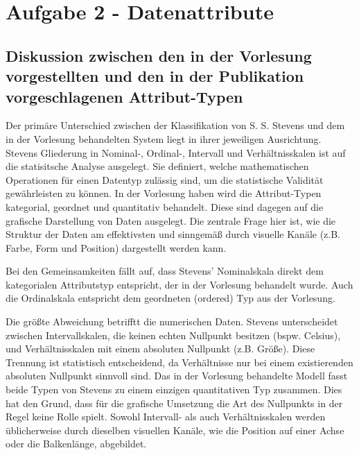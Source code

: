 \documentclass[10pt, a4paper]{article}
\begin{document}
% 


\section*{Aufgabe 2 - Datenattribute}
\subsection*{Diskussion zwischen den in der Vorlesung vorgestellten und den in der Publikation vorgeschlagenen Attribut-Typen}

Der primäre Unterschied zwischen der Klassifikation von S. S. Stevens und dem in der Vorlesung behandelten System liegt in ihrer jeweiligen Ausrichtung.
Stevens Gliederung in Nominal-, Ordinal-, Intervall und Verhältnisskalen ist auf die statisitsche Analyse ausgelegt.
Sie definiert, welche mathematischen Operationen für einen Datentyp zulässig sind, um die statistische Validität gewährleisten zu können.
In der Vorlesung haben wird die Attribut-Typen kategorial, geordnet und quantitativ behandelt. Diese sind dagegen auf die grafische Darstellung von Daten
ausgelegt. Die zentrale Frage hier ist, wie die Struktur der Daten am effektivsten und sinngemäß durch visuelle Kanäle (z.B. Farbe, Form und Position) dargestellt werden kann.

Bei den Gemeinsamkeiten fällt auf, dass Stevens' Nominalskala direkt dem kategorialen Attributstyp entspricht, der in der Vorlesung behandelt wurde. 
Auch die Ordinalskala entspricht dem geordneten (ordered) Typ aus der Vorlesung.

Die größte Abweichung betrifftt die numerischen Daten. Stevens unterscheidet zwischen Intervallskalen, die keinen echten Nullpunkt besitzen (bspw. Celsius), 
und Verhältnisskalen mit einem absoluten Nullpunkt (z.B. Größe). 
Diese Trennung ist statistisch entscheidend, da Verhältnisse nur bei einem existierenden absoluten Nullpunkt sinnvoll sind. 
Das in der Vorlesung behandelte Modell fasst beide Typen von Stevens zu einem einzigen quantitativen Typ zusammen. 
Dies hat den Grund, dass für die grafische Umsetzung die Art des Nullpunkts in der Regel keine Rolle spielt. 
Sowohl Intervall- als auch Verhältnisskalen werden üblicherweise durch dieselben visuellen Kanäle, wie die Position auf einer Achse oder die Balkenlänge, abgebildet.
\end{document}

